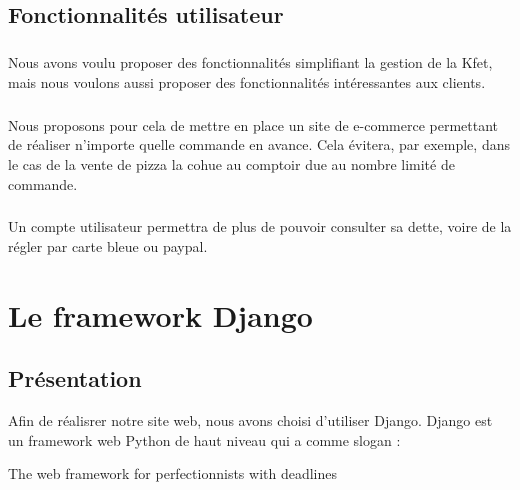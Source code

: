 \documentclass[twoside,UTF8]{EPURapport}
\begin{document}
    \section{Fonctionnalités utilisateur}

        \paragraph{}Nous avons voulu proposer des fonctionnalités simplifiant la gestion de la Kfet, mais nous voulons aussi proposer des fonctionnalités intéressantes aux clients.

        \paragraph{}Nous proposons pour cela de mettre en place un site de e-commerce permettant de réaliser n'importe quelle commande en avance. Cela évitera, par exemple, dans le cas de la vente de pizza la cohue au comptoir due au nombre limité de commande.

        \paragraph{}Un compte utilisateur permettra de plus de pouvoir consulter sa dette, voire de la régler par carte bleue ou paypal.

\chapter{Le framework Django}

\section{Présentation}
Afin de réalisrer notre site web, nous avons choisi d'utiliser Django. Django est un framework web Python de haut niveau qui a comme slogan :\\
\begin{center}
    \begin{LARGE}
    The web framework for perfectionnists with deadlines
    \end{LARGE}
\end{center}
\end{document}
